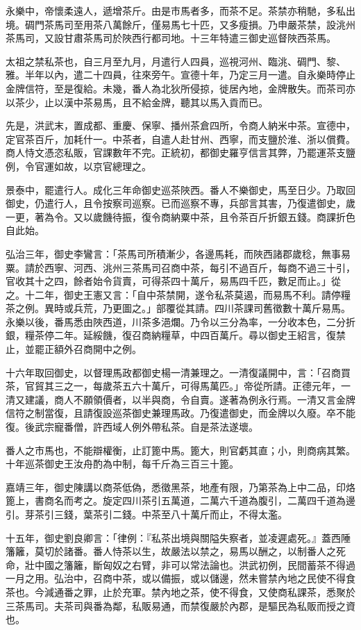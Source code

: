 永樂中，帝懷柔遠人，遞增茶斤。由是市馬者多，而茶不足。茶禁亦稍馳，多私出境。碉門茶馬司至用茶八萬餘斤，僅易馬七十匹，又多瘦損。乃申嚴茶禁，設洮州茶馬司，又設甘肅茶馬司於陜西行都司地。十三年特遣三御史巡督陜西茶馬。

太祖之禁私茶也，自三月至九月，月遣行人四員，巡視河州、臨洮、碉門、黎、雅。半年以內，遣二十四員，往來旁午。宣德十年，乃定三月一遣。自永樂時停止金牌信符，至是復給。未幾，番人為北狄所侵掠，徙居內地，金牌散失。而茶司亦以茶少，止以漢中茶易馬，且不給金牌，聽其以馬入貢而已。

先是，洪武末，置成都、重慶、保寧、播州茶倉四所，令商人納米中茶。宣德中，定官茶百斤，加耗什一。中茶者，自遣人赴甘州、西寧，而支鹽於淮、浙以償費。商人恃文憑恣私販，官課數年不完。正統初，都御史羅亨信言其弊，乃罷運茶支鹽例，令官運如故，以京官總理之。

景泰中，罷遣行人。成化三年命御史巡茶陜西。番人不樂御史，馬至日少。乃取回御史，仍遣行人，且令按察司巡察。已而巡察不專，兵部言其害，乃復遣御史，歲一更，著為令。又以歲饑待振，復令商納粟中茶，且令茶百斤折銀五錢。商課折色自此始。

弘治三年，御史李鸞言：「茶馬司所積漸少，各邊馬耗，而陜西諸郡歲稔，無事易粟。請於西寧、河西、洮州三茶馬司召商中茶，每引不過百斤，每商不過三十引，官收其十之四，餘者始令貨賣，可得茶四十萬斤，易馬四千匹，數足而止。」從之。十二年，御史王憲又言：「自中茶禁開，遂令私茶莫遏，而易馬不利。請停糧茶之例。異時或兵荒，乃更圖之。」部覆從其請。四川茶課司舊徵數十萬斤易馬。永樂以後，番馬悉由陜西道，川茶多浥爛。乃令以三分為率，一分收本色，二分折銀，糧茶停二年。延綏饑，復召商納糧草，中四百萬斤。尋以御史王紹言，復禁止，並罷正額外召商開中之例。

十六年取回御史，以督理馬政都御史楊一清兼理之。一清復議開中，言：「召商買茶，官貿其三之一，每歲茶五六十萬斤，可得馬萬匹。」帝從所請。正德元年，一清又建議，商人不願領價者，以半與商，令自賣。遂著為例永行焉。一清又言金牌信符之制當復，且請復設巡茶御史兼理馬政。乃復遣御史，而金牌以久廢。卒不能復。後武宗寵番僧，許西域人例外帶私茶。自是茶法遂壞。

番人之市馬也，不能辯權衡，止訂篦中馬。篦大，則官虧其直；小，則商病其繁。十年巡茶御史王汝舟酌為中制，每千斤為三百三十篦。

嘉靖三年，御史陳講以商茶低偽，悉徵黑茶，地產有限，乃第茶為上中二品，印烙篦上，書商名而考之。旋定四川茶引五萬道，二萬六千道為腹引，二萬四千道為邊引。芽茶引三錢，葉茶引二錢。中茶至八十萬斤而止，不得太濫。

十五年，御史劉良卿言：「律例：『私茶出境與關隘失察者，並凌遲處死。』蓋西陲籓籬，莫切於諸番。番人恃茶以生，故嚴法以禁之，易馬以酬之，以制番人之死命，壯中國之籓籬，斷匈奴之右臂，非可以常法論也。洪武初例，民間蓄茶不得過一月之用。弘治中，召商中茶，或以備振，或以儲邊，然未嘗禁內地之民使不得食茶也。今減通番之罪，止於充軍。禁內地之茶，使不得食，又使商私課茶，悉聚於三茶馬司。夫茶司與番為鄰，私販易通，而禁復嚴於內郡，是驅民為私販而授之資也。


